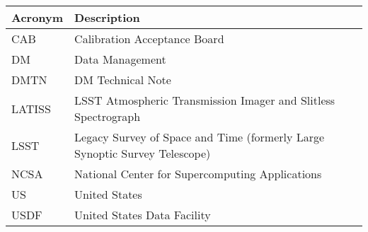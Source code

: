 \addtocounter{table}{-1}
\begin{longtable}{p{}p{}}\hline
\textbf{Acronym} & \textbf{Description}  \\\hline

CAB & Calibration Acceptance Board \\\hline
DM & Data Management \\\hline
DMTN & DM Technical Note \\\hline
LATISS & LSST Atmospheric Transmission Imager and Slitless Spectrograph \\\hline
LSST & Legacy Survey of Space and Time (formerly Large Synoptic Survey Telescope) \\\hline
NCSA & National Center for Supercomputing Applications \\\hline
US & United States \\\hline
USDF & United States Data Facility \\\hline
\end{longtable}
